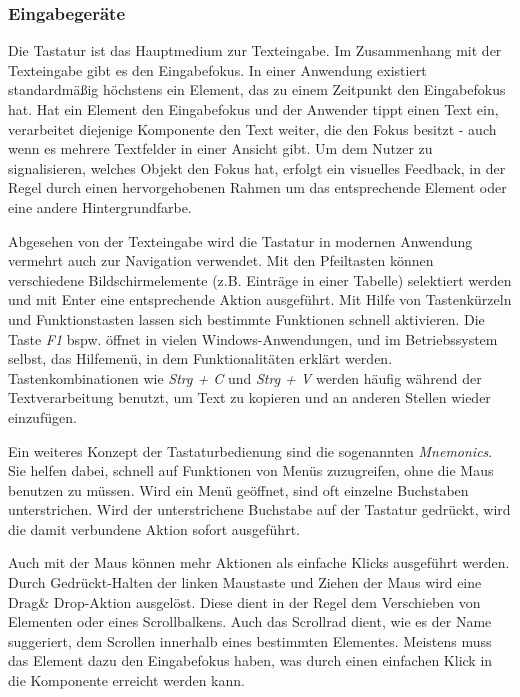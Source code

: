 \subsubsection{Eingabegeräte} \label{sec:inputDevices}
Die Tastatur ist das Hauptmedium zur Texteingabe. Im Zusammenhang mit der Texteingabe gibt es den Eingabefokus. In einer Anwendung existiert standardmäßig höchstens ein Element, das zu einem Zeitpunkt den Eingabefokus hat. Hat ein Element den Eingabefokus und der Anwender tippt einen Text ein, verarbeitet diejenige Komponente den Text weiter, die den Fokus besitzt - auch wenn es mehrere Textfelder in einer Ansicht gibt. Um dem Nutzer zu signalisieren, welches Objekt den Fokus hat, erfolgt ein visuelles Feedback, in der Regel durch einen hervorgehobenen Rahmen um das entsprechende Element oder eine andere Hintergrundfarbe.\par
Abgesehen von der Texteingabe wird die Tastatur in modernen Anwendung vermehrt auch zur Navigation verwendet. Mit den Pfeiltasten können verschiedene Bildschirmelemente (z.B. Einträge in einer Tabelle) selektiert werden und mit Enter eine entsprechende Aktion ausgeführt. Mit Hilfe von Tastenkürzeln und Funktionstasten lassen sich bestimmte Funktionen schnell aktivieren. Die Taste \textit{F1} bspw. öffnet in vielen Windows-Anwendungen, und im Betriebssystem selbst, das Hilfemenü, in dem Funktionalitäten erklärt werden. Tastenkombinationen wie \textit{Strg + C} und \textit{Strg + V} werden häufig während der Textverarbeitung benutzt, um Text zu kopieren und an anderen Stellen wieder einzufügen.\par
Ein weiteres Konzept der Tastaturbedienung sind die sogenannten \textit{Mnemonics}. Sie helfen dabei, schnell auf Funktionen von Menüs zuzugreifen, ohne die Maus benutzen zu müssen. Wird ein Menü geöffnet, sind oft einzelne Buchstaben unterstrichen. Wird der unterstrichene Buchstabe auf der Tastatur gedrückt, wird die damit verbundene Aktion sofort ausgeführt.\par
{}
Auch mit der Maus können mehr Aktionen als einfache Klicks ausgeführt werden. Durch Gedrückt-Halten der linken Maustaste und Ziehen der Maus wird eine Drag\& Drop-Aktion ausgelöst. Diese dient in der Regel dem Verschieben von Elementen oder eines Scrollbalkens. Auch das Scrollrad dient, wie es der Name suggeriert, dem Scrollen innerhalb eines bestimmten Elementes. Meistens muss das Element dazu den Eingabefokus haben, was durch einen einfachen Klick in die Komponente erreicht werden kann.\par
